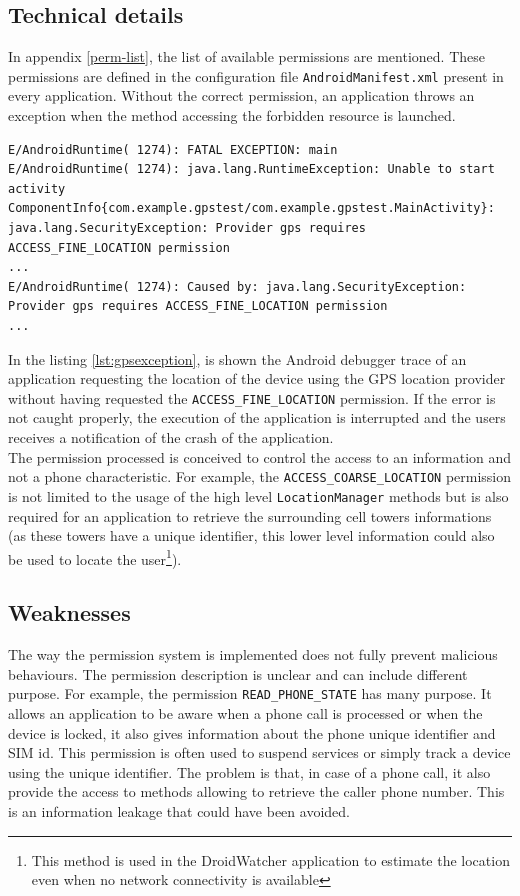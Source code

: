 \subsection{Technical details}
In appendix \ref{perm-list}, the list of available permissions are mentioned.
These permissions are defined in the configuration file \texttt{AndroidManifest.xml} present in every application.
Without the correct permission, an application throws an exception when the method accessing the forbidden resource is launched.

\begin{lstlisting}[breaklines,caption={Example of permission violation log},label={lst:gpsexception},numbers=none]
E/AndroidRuntime( 1274): FATAL EXCEPTION: main
E/AndroidRuntime( 1274): java.lang.RuntimeException: Unable to start activity ComponentInfo{com.example.gpstest/com.example.gpstest.MainActivity}: java.lang.SecurityException: Provider gps requires ACCESS_FINE_LOCATION permission
...
E/AndroidRuntime( 1274): Caused by: java.lang.SecurityException: Provider gps requires ACCESS_FINE_LOCATION permission
...
\end{lstlisting}

In the listing \ref{lst:gpsexception}, is shown the Android debugger trace of an application requesting the location of the device using the GPS location provider without having requested the \texttt{ACCESS\_FINE\_LOCATION} permission.
If the error is not caught properly, the execution of the application is interrupted and the users receives a notification of the crash of the application.\\

The permission processed is conceived to control the access to an information and not a phone characteristic.
For example, the \texttt{ACCESS\_COARSE\_LOCATION} permission is not limited to the usage of the high level \texttt{LocationManager} methods but is also required for an application to retrieve the surrounding cell towers informations (as these towers have a unique identifier, this lower level information could also be used to locate the user\footnote{This method is used in the DroidWatcher application to estimate the location even when no network connectivity is available}).

\subsection{Weaknesses}

The way the permission system is implemented does not fully prevent malicious behaviours.
The permission description is unclear and can include different purpose.
For example, the permission \texttt{READ\_PHONE\_STATE} has many purpose.
It allows an application to be aware when a phone call is processed or when the device is locked, it also gives information about the phone unique identifier and SIM id.
This permission is often used to suspend services or simply track a device using the unique identifier.
The problem is that, in case of a phone call, it also provide the access to methods allowing to retrieve the caller phone number.
This is an information leakage that could have been avoided.\\


